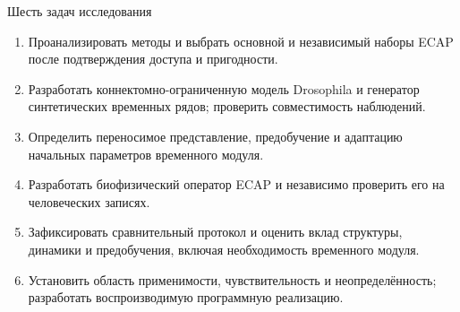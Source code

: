 \begin{frame}{Шесть задач исследования}
\begin{enumerate}
\item Проанализировать методы и выбрать основной и независимый наборы ECAP после подтверждения доступа и пригодности.
\item Разработать коннектомно-ограниченную модель Drosophila и генератор синтетических временных рядов; проверить совместимость наблюдений.
\item Определить переносимое представление, предобучение и адаптацию начальных параметров временного модуля.
\item Разработать биофизический оператор ECAP и независимо проверить его на человеческих записях.
\item Зафиксировать сравнительный протокол и оценить вклад структуры, динамики и предобучения, включая необходимость временного модуля.
\item Установить область применимости, чувствительность и неопределённость; разработать воспроизводимую программную реализацию.
\end{enumerate}
\end{frame}
